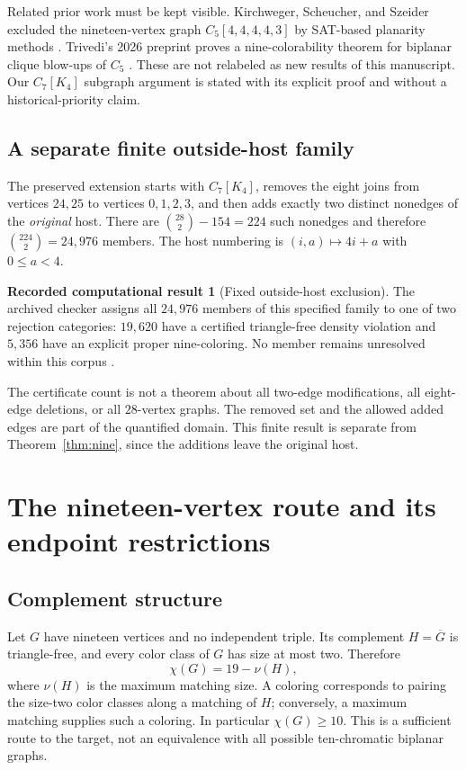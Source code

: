 \documentclass[11pt,letterpaper]{article}
\theoremstyle{definition}
\newtheorem{result}[theorem]{Recorded computational result}
\theoremstyle{remark}\newtheorem{remark}[theorem]{Remark}
\begin{document}
Related prior work must be kept visible. Kirchweger, Scheucher, and Szeider excluded the nineteen-vertex graph $C_5[4,4,4,4,3]$ by SAT-based planarity methods \cite{KSS}. Trivedi's 2026 preprint proves a nine-colorability theorem for biplanar clique blow-ups of $C_5$ \cite{Trivedi}. These are not relabeled as new results of this manuscript. Our $C_7[K_4]$ subgraph argument is stated with its explicit proof and without a historical-priority claim.

\subsection{A separate finite outside-host family}
The preserved extension starts with $C_7[K_4]$, removes the eight joins from vertices $24,25$ to vertices $0,1,2,3$, and then adds exactly two distinct nonedges of the \emph{original} host. There are $\binom{28}{2}-154=224$ such nonedges and therefore $\binom{224}{2}=24,976$ members. The host numbering is $(i,a)\mapsto4i+a$ with $0\leq a<4$.

\begin{result}[Fixed outside-host exclusion]\label{res:earthfinite}
The archived checker assigns all $24,976$ members of this specified family to one of two rejection categories: $19,620$ have a certified triangle-free density violation and $5,356$ have an explicit proper nine-coloring. No member remains unresolved within this corpus \cite{BeasleyDAG,BeasleyStatus}.
\end{result}
The certificate count is not a theorem about all two-edge modifications, all eight-edge deletions, or all $28$-vertex graphs. The removed set and the allowed added edges are part of the quantified domain. This finite result is separate from Theorem~\ref{thm:nine}, since the additions leave the original host.

\section{The nineteen-vertex route and its endpoint restrictions}
\subsection{Complement structure}
Let $G$ have nineteen vertices and no independent triple. Its complement $H=\overline G$ is triangle-free, and every color class of $G$ has size at most two. Therefore
\begin{equation}\label{eq:matching}
\chi(G)=19-\nu(H),
\end{equation}
where $\nu(H)$ is the maximum matching size. A coloring corresponds to pairing the size-two color classes along a matching of $H$; conversely, a maximum matching supplies such a coloring. In particular $\chi(G)\geq10$. This is a sufficient route to the target, not an equivalence with all possible ten-chromatic biplanar graphs.
\end{document}
